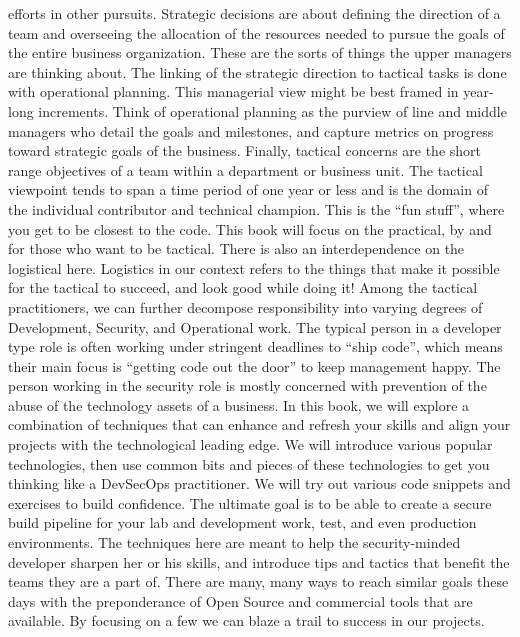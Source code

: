 efforts in other pursuits.
\justify{}
Strategic decisions are about defining the direction of a team and overseeing
the allocation of the resources needed to pursue the goals of the entire
business organization. These are the sorts of things the upper managers are
thinking about. The linking of the strategic direction to tactical tasks is
done with operational planning. This managerial view might be best framed in
year-long increments. Think of operational planning as the purview of line
and middle managers who detail the goals and milestones, and capture metrics
on progress toward strategic goals of the business. Finally, tactical concerns
are the short range objectives of a team within a department or business unit.
The tactical viewpoint tends to span a time period of one year or less and is
the domain of the individual contributor and technical champion. This is the
``fun stuff'', where you get to be closest to the code. This book will focus
on the practical, by and for those who want to be tactical. There is also
an interdependence on the logistical here. Logistics in our context refers to
the things that make it possible for the tactical to succeed, and look good
while doing it!
\justify{}
Among the tactical practitioners, we can further decompose responsibility into
varying degrees of Development, Security, and Operational work. The typical
person in a developer type role
is often working under stringent deadlines to ``ship code'', which means their
main focus is ``getting code out the door'' to keep management happy. The person
working in the security role is mostly concerned with prevention of the abuse
of the technology assets of a business.
\justify{}
In this book, we will explore a combination of techniques that can enhance and refresh
your skills and align your projects with the technological leading edge. We will
introduce various popular technologies, then use common bits and pieces of
these technologies to get you thinking like a DevSecOps practitioner. We will try out
various code snippets and exercises to build confidence. The ultimate goal is to be able to
create a secure build pipeline for your lab and development work,
test, and even production environments. The techniques here are meant to help
the security-minded developer sharpen her or his skills, and introduce tips
and tactics that benefit the teams they are a part of. There are many, many
ways to reach similar goals these days with the preponderance of Open Source
and commercial tools that are available. By focusing on a few we can blaze a
trail to success in our projects.
\justify{}
